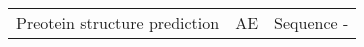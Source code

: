 \begin{center}
\begin{tabular}{l c c}
    Preotein structure prediction & AE & Sequence -
\end{tabular}
\end{center}
